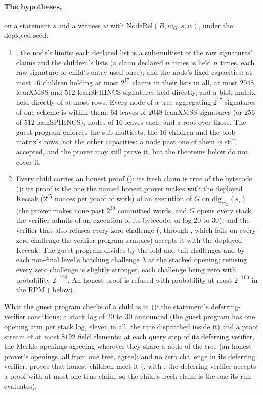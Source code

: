 \documentclass[11pt]{article}
\begin{document}
\paragraph{The hypotheses,} on a statement $s$ and a witness $w$ with
$\mathrm{NodeRel}(B, iv_G, s, w)$, under the deployed seed:
\begin{enumerate}
\item {}, the node's limits: each declared list
is a sub-multiset of the raw signatures' claims and the children's lists (a claim declared $n$ times
is held $n$ times, each raw signature or child's entry used once); and the node's fixed capacities: at most $16$ children holding at most $2^{17}$ claims in their lists in all, at most $2048$ leanXMSS and $512$ leanSPHINCS signatures held directly, and a blob matrix held directly of at most  rows. Every node of a tree aggregating $2^{17}$ signatures of one scheme is within them: $64$ leaves of $2048$ leanXMSS signatures (or $256$ of $512$ leanSPHINCS), nodes of $16$ leaves each, and a root over those. The guest program enforces the sub-multisets, the $16$ children and the blob matrix's rows, not the other capacities: a node past one of them is still accepted, and the prover may still prove it, but the theorems below do not cover it.
\item Every child carries an honest proof (): its fresh claim is true of the
bytecode (); its proof is the one the named honest prover
 makes with the deployed Keccak
($2^{35}$ nonces per proof of work) of an execution of $G$ on $\mathrm{dig}_{iv_G}(s_i)$ (the
prover makes none past $2^{30}$ committed words, and $G$ opens every stack the verifier admits of an
execution of its bytecode, of log $20$ to $30$); and the verifier that also refuses
every zero challenge (, through
, which fails on every zero challenge the verifier
program samples) accepts it with the deployed Keccak. The guest program divides by the fold and tail
challenges and by each non-final level's batching challenge $\lambda$ at the stacked opening; refusing every zero
challenge is slightly stronger, each challenge being zero with probability $2^{-128}$. An honest
proof is refused with probability at most $2^{-100}$ in the RPM (
below).
\end{enumerate}
What the guest program checks of a child is in  (): the
statement's deferring-verifier conditions; a stack log of $20$ to $30$ announced (the guest program
has one opening arm per stack log, eleven in all, the rate dispatched inside it) and a proof stream of at most $8192$ field
elements; at each query step of its deferring verifier, the Merkle openings agreeing wherever they
share a node of the tree (an honest prover's openings, all from one tree, agree); and no zero
challenge in its deferring verifier.  proves that honest children meet it
(, with : the deferring verifier accepts a proof
with at most one true claim, so the child's fresh claim is the one its run evaluates).
\end{document}
